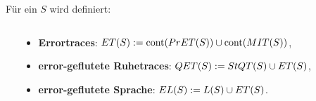 \begin{frame}
  \begin{Def}[Semantik]
    \small
    Für ein \EIO{} $S$ wird definiert:
  \begin{columns}[]
    \begin{column}{.05\textwidth}
    \end{column}
    \begin{column}{.42\textwidth}
      \begin{block}{}
      \begin{itemize}
        \item \textbf{Errortraces}: $ET{}(S):=\mathrm{cont}{}(PrET{}(S))\cup
          \mathrm{cont}{}(MIT{}(S))$,
        \item \textbf{error-geflutete Ruhetraces}: $QET{}(S) := StQT{}(S)\cup
          ET{}(S)$,
        \item \textbf{error-geflutete Sprache}: $EL{}(S):=L(S)\cup ET{}(S)$.
      \end{itemize}
      \end{block}
    \end{column}
    \begin{column}{.05\textwidth}
    \end{column}
    \begin{column}{.42\textwidth}
    \end{column}
    \begin{column}{.05\textwidth}
    \end{column}
  \end{columns}
  \end{Def}
\end{frame}

